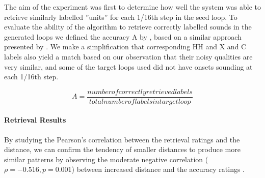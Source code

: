The aim of the experiment was first to determine how well the system was able to retrieve similarly labelled  ”units” for each 1/16th step in the seed loop. To evaluate the ability of the algorithm to retrieve correctly labelled sounds in the generated loops we defined the accuracy A by  , based on a similar approach presented by \cite{Thompson2014}.  We make a simplification that corresponding HH and X and C labels also yield a match based on our observation that their noisy qualities are very similar, and some of the target loops used did not have onsets sounding at each 1/16th step.

\begin{equation}
\label{eq:accuracy}	
A = \frac{number of correctly retrieved labels}{total number of labels in target loop}
\end{equation}  

\paragraph{Retrieval Results}

By studying the Pearson's correlation between the retrieval ratings and the distance, we can confirm the tendency of smaller distances to produce more similar patterns by observing the moderate negative correlation ($\rho = -0.516, p = 0.001$) between increased distance and the accuracy ratings .

